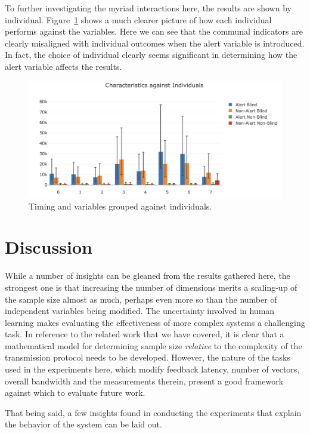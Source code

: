 \documentclass[
hidelinks,
12pt, %
oneside, %
english, %
doublespacing, %
headsepline, %
]{MastersDoctoralThesis} %
\begin{document}
To further investigating the myriad interactions here, the results are shown by individual. Figure~\ref{fig:p2individuals} shows a much clearer picture of how each individual performs against the variables. Here we can see that the communal indicators are clearly misaligned with individual outcomes when the alert variable is introduced. In fact, the choice of individual clearly seems significant in determining how the alert variable affects the results.

\begin{figure}[h]
	\centering\includegraphics[width=1\linewidth]{images/individuals}
	\decoRule
	\caption[Phase 2 Individual Timing]{Timing and variables grouped against individuals.}
	\label{fig:p2individuals}
\end{figure}

\section{Discussion}

While a number of insights can be gleaned from the results gathered here, the strongest one is that increasing the number of dimensions merits a scaling-up of the sample size almost as much, perhaps even more so than the number of independent variables being modified. The uncertainty involved in human learning makes evaluating the effectiveness of more complex systems a challenging task. In reference to the related work that we have covered, it is clear that a mathematical model for determining sample size \textit{relative} to the complexity of the transmission protocol needs to be developed. However, the nature of the tasks used in the experiments here, which modify feedback latency, number of vectors, overall bandwidth and the measurements therein, present a good framework against which to evaluate future work.

That being said, a few insights found in conducting the experiments that explain the behavior of the system can be laid out.
\end{document}
